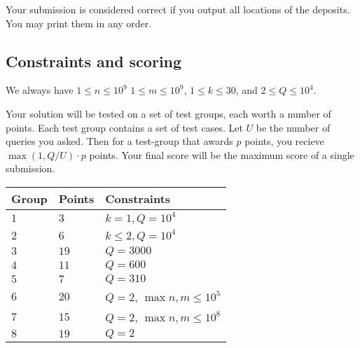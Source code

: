 Your submission is considered correct if you output all locations of the deposits.
You may print them in any order.

\subsection*{Constraints and scoring}

We always have 
$1\leq n \leq 10^9$ %
$1\leq m\leq 10^9$,  %
$1 \leq k \leq 30$, %
and
$2 \le Q \le 10^4$. %

Your solution will be tested on a set of test groups, each worth a number of points.
Each test group contains a set of test cases.
Let $U$ be the number of queries you asked. Then for a test-group that awards $p$ points, you recieve $\max(1,Q/U)\cdot p$ points.
Your final score will be the maximum score of a single submission.

\medskip
\begin{tabular}{lll}
Group & Points & Constraints \\\hline
  $1$ & $3$ & $k = 1, Q = 10^4$\\
  $2$ & $6$ & $k \le 2, Q = 10^4$\\
  $3$ & $19$ & $Q = 3000$\\
  $4$ & $11$ & $Q = 600$\\
  $5$ & $7$ & $Q = 310$\\
  $6$ & $20$ & $Q = 2$, $\max{n,m} \le 10^5$\\
  $7$ & $15$ & $Q = 2$, $\max{n,m} \le 10^8$\\
  $8$ & $19$ & $Q = 2$
\end{tabular}

